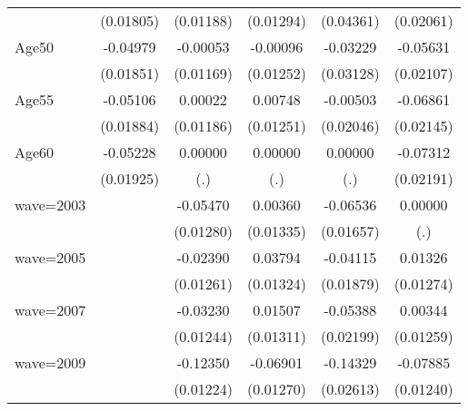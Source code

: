 {\begin{longtable}{l*{5}{c}}
                    &   (0.01805)         &   (0.01188)         &   (0.01294)         &   (0.04361)         &   (0.02061)         \\
\addlinespace
Age50               &    -0.04979\sym{***}&    -0.00053         &    -0.00096         &    -0.03229         &    -0.05631\sym{***}\\
                    &   (0.01851)         &   (0.01169)         &   (0.01252)         &   (0.03128)         &   (0.02107)         \\
\addlinespace
Age55               &    -0.05106\sym{***}&     0.00022         &     0.00748         &    -0.00503         &    -0.06861\sym{***}\\
                    &   (0.01884)         &   (0.01186)         &   (0.01251)         &   (0.02046)         &   (0.02145)         \\
\addlinespace
Age60               &    -0.05228\sym{***}&     0.00000         &     0.00000         &     0.00000         &    -0.07312\sym{***}\\
                    &   (0.01925)         &         (.)         &         (.)         &         (.)         &   (0.02191)         \\
\addlinespace
wave=2003           &                     &    -0.05470\sym{***}&     0.00360         &    -0.06536\sym{***}&     0.00000         \\
                    &                     &   (0.01280)         &   (0.01335)         &   (0.01657)         &         (.)         \\
\addlinespace
wave=2005           &                     &    -0.02390\sym{*}  &     0.03794\sym{***}&    -0.04115\sym{**} &     0.01326         \\
                    &                     &   (0.01261)         &   (0.01324)         &   (0.01879)         &   (0.01274)         \\
\addlinespace
wave=2007           &                     &    -0.03230\sym{***}&     0.01507         &    -0.05388\sym{**} &     0.00344         \\
                    &                     &   (0.01244)         &   (0.01311)         &   (0.02199)         &   (0.01259)         \\
\addlinespace
wave=2009           &                     &    -0.12350\sym{***}&    -0.06901\sym{***}&    -0.14329\sym{***}&    -0.07885\sym{***}\\
                    &                     &   (0.01224)         &   (0.01270)         &   (0.02613)         &   (0.01240)         \\

\end{longtable}}
